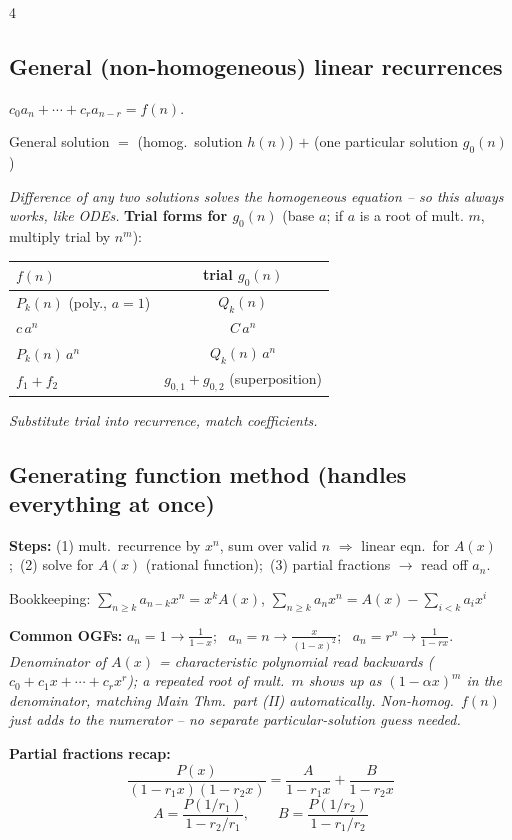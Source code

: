 \documentclass[8pt]{extarticle}
\newcommand{\note}[1]{{\footnotesize\color{gray!70!black}\emph{#1}}}
\begin{document}
\begin{multicols}{4}
\subsection*{General (non-homogeneous) linear recurrences}
$c_0a_n+\cdots+c_ra_{n-r}=f(n)$.
\begin{key}
General solution $=$ (homog.\ solution $h(n)$) $+$ (one particular solution $g_0(n)$)
\end{key}
\note{Difference of any two solutions solves the homogeneous equation -- so this always works, like ODEs.}
\textbf{Trial forms for $g_0(n)$} (base $a$; if $a$ is a root of mult. $m$, multiply trial by $n^m$):
\begin{tab}
\centering\renewcommand{\arraystretch}{1.5}
\begin{tabular}{@{}l c@{}}
\toprule
$f(n)$ & trial $g_0(n)$ \\ \midrule
$P_k(n)$ (poly., $a{=}1$) & $Q_k(n)$ \\
$c\,a^n$ & $C\,a^n$ \\
$P_k(n)\,a^n$ & $Q_k(n)\,a^n$ \\
$f_1+f_2$ & $g_{0,1}+g_{0,2}$ (superposition) \\
\bottomrule
\end{tabular}
\end{tab}
\note{Substitute trial into recurrence, match coefficients.}

\subsection*{Generating function method (handles everything at once)}
\textbf{Steps:} (1) mult.\ recurrence by $x^n$, sum over valid $n$ $\Rightarrow$ linear eqn.\ for $A(x)$;\ (2) solve for $A(x)$ (rational function);\ (3) partial fractions $\to$ read off $a_n$.
\begin{key}
Bookkeeping: $\displaystyle\sum_{n\ge k}a_{n-k}x^n=x^kA(x)$, \quad $\displaystyle\sum_{n\ge k}a_nx^n=A(x)-\sum_{i<k}a_ix^i$
\end{key}
\textbf{Common OGFs:} $a_n{=}1\!\to\!\frac1{1-x}$; \ $a_n{=}n\!\to\!\frac{x}{(1-x)^2}$; \ $a_n{=}r^n\!\to\!\frac1{1-rx}$.
\note{Denominator of $A(x)$ = characteristic polynomial read backwards ($c_0+c_1x+\cdots+c_rx^r$); a repeated root of mult.\ $m$ shows up as $(1-\alpha x)^m$ in the denominator, matching Main Thm.\ part (II) automatically. Non-homog.\ $f(n)$ just adds to the numerator -- no separate particular-solution guess needed.}

\textbf{Partial fractions recap:}
\[\frac{P(x)}{(1-r_1x)(1-r_2x)}=\frac{A}{1-r_1x}+\frac{B}{1-r_2x}\]
\[A=\frac{P(1/r_1)}{1-r_2/r_1},\qquad B=\frac{P(1/r_2)}{1-r_1/r_2}\]


\end{multicols}
\end{document}
